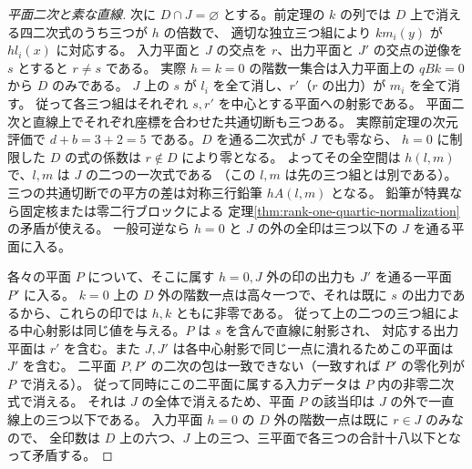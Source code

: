 \begin{proof}[平面二次と素な直線]
次に $D\cap J=\varnothing$ とする。前定理の $k$ の列では $D$ 上で消える四二次式のうち三つが $h$ の倍数で、
適切な独立三つ組により $k m_i(y)$ が $h l_i(x)$ に対応する。
入力平面と $J$ の交点を $r$、出力平面と $J'$ の交点の逆像を $s$ とすると $r\ne s$ である。
実際 $h=k=0$ の階数一集合は入力平面上の $q Bk=0$ から $D$ のみである。
$J$ 上の $s$ が $l_i$ を全て消し、$r'$（$r$ の出力）が $m_i$ を全て消す。
従って各三つ組はそれぞれ $s,r'$ を中心とする平面への射影である。
平面二次と直線上でそれぞれ座標を合わせた共通切断も三つある。
実際前定理の次元評価で $d+b=3+2=5$ である。$D$ を通る二次式が $J$ でも零なら、
$h=0$ に制限した $D$ の式の係数は $r\notin D$ により零となる。
よってその全空間は $h(l,m)$ で、$l,m$ は $J$ の二つの一次式である
（この $l,m$ は先の三つ組とは別である）。
三つの共通切断での平方の差は対称三行鉛筆 $hA(l,m)$ となる。
鉛筆が特異なら固定核または零二行ブロックによる
定理\ref{thm:rank-one-quartic-normalization}の矛盾が使える。
一般可逆なら $h=0$ と $J$ の外の全印は三つ以下の $J$ を通る平面に入る。

各々の平面 $P$ について、そこに属す $h=0,J$ 外の印の出力も $J'$ を通る一平面 $P'$ に入る。
$k=0$ 上の $D$ 外の階数一点は高々一つで、それは既に $s$ の出力であるから、これらの印では $h,k$ ともに非零である。
従って上の二つの三つ組による中心射影は同じ値を与える。$P$ は $s$ を含んで直線に射影され、
対応する出力平面は $r'$ を含む。また $J,J'$ は各中心射影で同じ一点に潰れるためこの平面は $J'$ を含む。
二平面 $P,P'$ の二次の包は一致できない（一致すれば $P'$ の零化列が $P$ で消える）。
従って同時にこの二平面に属する入力データは $P$ 内の非零二次式で消える。
それは $J$ の全体で消えるため、平面 $P$ の該当印は $J$ の外で一直線上の三つ以下である。
入力平面 $h=0$ の $D$ 外の階数一点は既に $r\in J$ のみなので、
全印数は $D$ 上の六つ、$J$ 上の三つ、三平面で各三つの合計十八以下となって矛盾する。
\end{proof}
